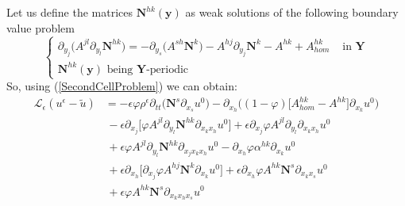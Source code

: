 Let us define the matrices $\mathbf{N}^{hk}(\mathbf{y})$ as weak solutions of the following boundary value problem
\begin{equation}
    \label{SecondCellProblem}
    \left \{
    \begin{array}{cc}
        \partial_{y_j} \big( A^{jl}\partial_{y_l} \mathbf{N}^{hk}\big) = -\partial_{y_s} \big( A^{sh} \mathbf{N}^k\big) - A^{hj}\partial_{y_j} \mathbf{N}^k - A^{hk} + A^{hk}_{hom} & \text{ in } \mathbf{Y}\\
        \mathbf{N}^{hk}(\mathbf{y}) \text{ being $\mathbf{Y}$-periodic}
    \end{array}
    \right .
\end{equation}
So, using (\ref{SecondCellProblem}) we can obtain:
\begin{align*}
    \mathcal{L}_{\epsilon} (u^{\epsilon} -\tilde{u}) & = - \epsilon \varphi \rho^{\epsilon} \partial_{tt} \big( \mathbf{N}^s \partial_{x_s} u^0\big) - \partial_{x_h} \big( (1-\varphi) \big[ A^{hk}_{hom} - A^{hk} \big] \partial_{x_k} u^0 \big) \\
    & \, - \epsilon \partial_{x_j} \big[ \varphi A^{jl} \partial_{y_l} \mathbf{N}^{hk} \partial_{x_k x_h} u^0 \big] + \epsilon \partial_{x_j} \varphi A^{jl} \partial_{y_l} \partial_{x_k x_h} u^0 \\
    &\, + \epsilon \varphi A^{jl} \partial_{y_l} \mathbf{N}^{hk} \partial_{x_j x_k x_h} u^0 - \partial_{x_h}\varphi \alpha^{hk} \partial_{x_k} u^0 \\
    & \, + \epsilon \partial_{x_h} \big[ \partial_{x_j} \varphi A^{hj} \mathbf{N}^{k} \partial_{x_k} u^0 \big] + \epsilon \partial_{x_h} \varphi A^{hk} \mathbf{N}^s \partial_{x_k x_s} u^0 \\
    & \, + \epsilon \varphi A^{hk} \mathbf{N}^s \partial_{x_k x_h x_s} u^0 
\end{align*}


